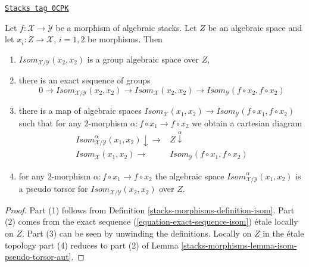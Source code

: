 \begin{lemma}
\label{stacks-morphisms-lemma-isom-pseudo-torsor-aut-over-space}
\href{https://stacks.math.columbia.edu/tag/0CPK}{\texttt{Stacks tag 0CPK}}

Let $f : \mathcal{X} \to \mathcal{Y}$ be a morphism of algebraic stacks.
Let $Z$ be an algebraic space and let $x_i : Z \to \mathcal{X}$, $i = 1, 2$
be morphisms. Then
\begin{enumerate}
\item $\mathit{Isom}_{\mathcal{X}/\mathcal{Y}}(x_2, x_2)$
is a group algebraic space over $Z$,
\item there is an exact sequence of groups
$$
0 \to \mathit{Isom}_{\mathcal{X}/\mathcal{Y}}(x_2, x_2)
\to \mathit{Isom}_\mathcal{X}(x_2, x_2)
\to \mathit{Isom}_\mathcal{Y}(f \circ x_2, f \circ x_2)
$$
\item there is a map of algebraic spaces
$
\mathit{Isom}_\mathcal{X}(x_1, x_2)
\to \mathit{Isom}_\mathcal{Y}(f \circ x_1, f \circ x_2)
$
such that for any $2$-morphism $\alpha : f \circ x_1 \to f \circ x_2$
we obtain a cartesian diagram
$$
\begin{array}{cc}\mathit{Isom}_{\mathcal{X}/\mathcal{Y}}^\alpha(x_1, x_2) \downarrow\longrightarrow & Z \overset{\alpha}{\downarrow} \\ \mathit{Isom}_\mathcal{X}(x_1, x_2) \longrightarrow & \mathit{Isom}_\mathcal{Y}(f \circ x_1, f \circ x_2)\end{array}
$$
\item for any $2$-morphism $\alpha : f \circ x_1 \to f \circ x_2$ the
algebraic space $\mathit{Isom}_{\mathcal{X}/\mathcal{Y}}^\alpha(x_1, x_2)$
is a pseudo torsor for $\mathit{Isom}_{\mathcal{X}/\mathcal{Y}}(x_2, x_2)$
over $Z$.
\end{enumerate}
\end{lemma}

\begin{proof}
Part (1) follows from Definition \ref{stacks-morphisms-definition-isom}.
Part (2) comes from the exact sequence (\ref{equation-exact-sequence-isom})
\'etale locally on $Z$. Part (3) can be seen by unwinding the definitions.
Locally on $Z$ in the \'etale topology part (4) reduces to
part (2) of Lemma \ref{stacks-morphisms-lemma-isom-pseudo-torsor-aut}.
\end{proof}

